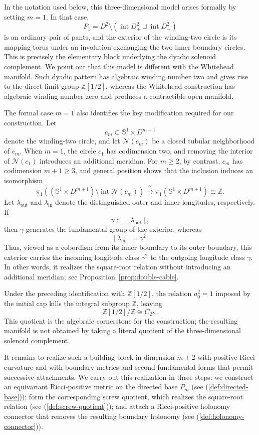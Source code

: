 \documentclass[11pt,reqno]{amsart}
\theoremstyle{definition}
\numberwithin{equation}{section}
\newcommand{\CPrufer}{C_{2^\infty}}
\begin{document}
In the notation used below, this three-dimensional model arises formally
by setting $m=1$.  In that case,
\[
 P_1
 =
 D^2\setminus
 \left(
 \operatorname{int}D^2_+
 \sqcup
 \operatorname{int}D^2_-
 \right)
\]
is an ordinary pair of pants, and the exterior of the winding-two circle
is its mapping torus under an involution exchanging the two inner
boundary circles.  This is precisely the elementary block underlying
the dyadic solenoid complement.  We point out that this
model is different with the Whitehead manifold.  Such dyadic pattern has algebraic
winding number two and gives rise to the direct-limit group
$\mathbb Z[1/2]$, whereas the Whitehead construction has algebraic winding
number zero and produces a contractible open manifold.

The formal case $m=1$ also identifies the key modification required for
our construction.  Let
\[
 c_m\subset \mathbb S^1\times D^{m+1}
\]
denote the winding-two circle, and let $\mathcal N(c_m)$ be a closed
tubular neighborhood of $c_m$.  When $m=1$, the circle $c_1$ has
codimension two, and removing the interior of $\mathcal N(c_1)$ introduces
an additional meridian.  For $m\ge2$, by contrast, $c_m$ has
codimension $m+1\ge3$, and general position shows that the inclusion
induces an isomorphism
\[
 \pi_1\left(
   (\mathbb S^1\times D^{m+1})
   \setminus\operatorname{int}\mathcal N(c_m)
 \right)
 \xrightarrow{\;\cong\;}
 \pi_1(\mathbb S^1\times D^{m+1})
 \cong\mathbb Z.
\]
Let $\lambda_{\mathrm{out}}$ and $\lambda_{\mathrm{in}}$ denote the
distinguished outer and inner longitudes, respectively.  If
\[
 \gamma:=[\lambda_{\mathrm{out}}],
\]
then $\gamma$ generates the fundamental group of the exterior, whereas
\[
 [\lambda_{\mathrm{in}}]=\gamma^2.
\]
Thus, viewed as a cobordism from its inner boundary to its outer
boundary, this exterior carries the incoming longitude class
\(\gamma^2\) to the outgoing longitude class \(\gamma\).  In other
words, it realizes the square-root relation without introducing an
additional meridian; see Proposition~\ref{prop:double-cable}.


Under the preceding identification with $\mathbb Z[1/2]$, the relation
$a_0^2=1$ imposed by the initial cap kills the integral subgroup
$\mathbb Z$, leaving
\[
 \mathbb Z[1/2]\big/\mathbb Z
 \cong
 \CPrufer.
\]
This quotient is the algebraic cornerstone for the construction; the
resulting manifold is not obtained by taking a literal quotient of the
three-dimensional solenoid complement.

It remains to realize such a building block in dimension $m+2$ with
positive Ricci curvature and with boundary metrics and second fundamental
forms that permit successive attachments. We carry out this realization in three steps: we construct an equivariant
Ricci-positive metric on the directed base \(P_m\) (see
(\ref{def:directed-base})); form the corresponding screw
quotient, which realizes the square-root relation (see
(\ref{def:screw-quotient})); and attach a Ricci-positive
holonomy connector that removes the resulting boundary holonomy (see (\ref{def:holonomy-connector})).
\end{document}
